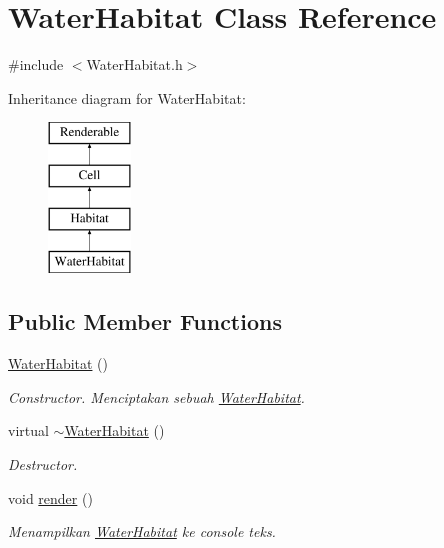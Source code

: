 \hypertarget{classWaterHabitat}{\section{Water\+Habitat Class Reference}
\label{classWaterHabitat}
}


{\ttfamily \#include $<$Water\+Habitat.\+h$>$}

Inheritance diagram for Water\+Habitat\+:\begin{figure}[H]
\begin{center}
\leavevmode
\includegraphics[height=4.000000cm]{classWaterHabitat}
\end{center}
\end{figure}
\subsection*{Public Member Functions}
\begin{DoxyCompactItemize}
\item 
\hypertarget{classWaterHabitat_a57a0d15fae5e17531835be2284df0fd1}{\hyperlink{classWaterHabitat_a57a0d15fae5e17531835be2284df0fd1}{Water\+Habitat} ()}\label{classWaterHabitat_a57a0d15fae5e17531835be2284df0fd1}

\begin{DoxyCompactList}\small\item\em Constructor. Menciptakan sebuah \hyperlink{classWaterHabitat}{Water\+Habitat}. \end{DoxyCompactList}\item 
\hypertarget{classWaterHabitat_abf6341b18b2fe62110998db3ffbde4b7}{virtual \hyperlink{classWaterHabitat_abf6341b18b2fe62110998db3ffbde4b7}{$\sim$\+Water\+Habitat} ()}\label{classWaterHabitat_abf6341b18b2fe62110998db3ffbde4b7}

\begin{DoxyCompactList}\small\item\em Destructor. \end{DoxyCompactList}\item 
\hypertarget{classWaterHabitat_a0820a384777ce7ba41244494e76eae13}{void \hyperlink{classWaterHabitat_a0820a384777ce7ba41244494e76eae13}{render} ()}\label{classWaterHabitat_a0820a384777ce7ba41244494e76eae13}

\begin{DoxyCompactList}\small\item\em Menampilkan \hyperlink{classWaterHabitat}{Water\+Habitat} ke console teks. \end{DoxyCompactList}\end{DoxyCompactItemize}
